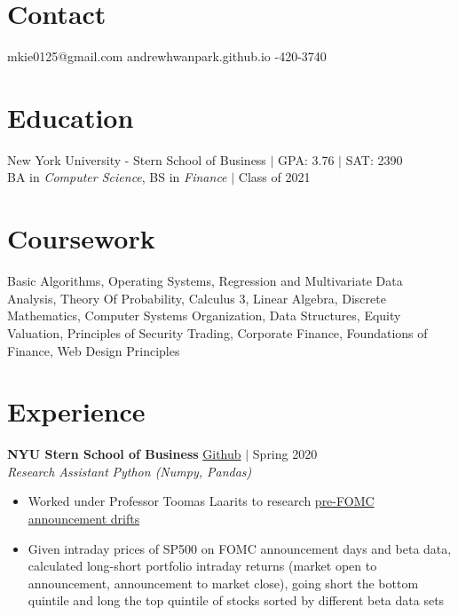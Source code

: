 \documentclass[margin]{res}
\begin{document}
 
 
 
\begin{resume} 
	 
	\section{Contact} 
	mkie0125@gmail.com \quad\quad\quad andrewhwanpark.github.io \quad\quad{}-420-3740
	
	\section{Education} 
	New York University - Stern School of Business $\vert$ GPA: 3.76 $\vert$ SAT: 2390 \\
	BA in {\it Computer Science}, BS in {\it Finance} $\vert$ Class of 2021
	
	
	\section{Coursework}
	Basic Algorithms, Operating Systems, Regression and Multivariate Data Analysis, Theory Of Probability, Calculus 3, Linear Algebra, Discrete Mathematics, Computer Systems Organization, Data Structures, Equity Valuation, Principles of Security Trading, Corporate Finance, Foundations of Finance, Web Design Principles
	
	\section{Experience}
	{\bf NYU Stern School of Business} \hfill \href{https://github.com/andrewhwanpark/spur}{Github} $\vert$ Spring 2020\\
	{\it Research Assistant} \hfill {\it Python (Numpy, Pandas)}
	\begin{itemize} \itemsep -2pt  %
		\item Worked under Professor Toomas Laarits to research \href{https://www.newyorkfed.org/medialibrary/media/research/staff_reports/sr512.pdf}{pre-FOMC announcement drifts}
		\item Given intraday prices of SP500 on FOMC announcement days and beta data, calculated long-short portfolio intraday returns (market open to announcement, announcement to market close), going short the bottom quintile and long the top quintile of stocks sorted by different beta data sets
	\end{itemize}
	

\end{resume}
\end{document}
